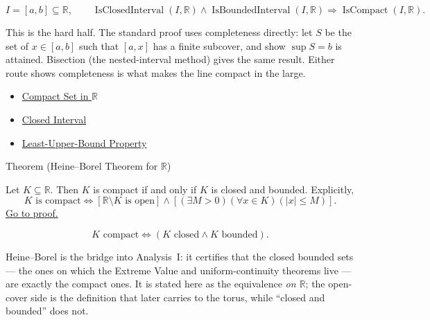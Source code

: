 \begin{remark*}
\[
I=[a,b]\subseteq\mathbb{R},\qquad
\operatorname{IsClosedInterval}(I,\mathbb{R})\land
\operatorname{IsBoundedInterval}(I,\mathbb{R})
\Longrightarrow
\operatorname{IsCompact}(I,\mathbb{R}).
\]
\end{remark*}
\begin{remark*}[Interpretation]
This is the hard half. The standard proof uses completeness directly: let $S$ be the set of $x\in[a,b]$ such that $[a,x]$ has a finite subcover, and show $\sup S=b$ is attained. Bisection (the nested-interval method) gives the same result. Either route shows completeness is what makes the line compact in the large.
\end{remark*}
\begin{dependencies}
\begin{itemize}
  \item \hyperref[def:compact-set]{Compact Set in $\mathbb{R}$}
  \item \hyperref[def:closed-interval]{Closed Interval}
  \item \hyperref[thm:lub-property-r]{Least-Upper-Bound Property}
\end{itemize}
\end{dependencies}
\begin{theorembox}{Theorem (Heine--Borel Theorem for $\mathbb{R}$)}
\begin{theorem}
\label{thm:heine-borel}
Let $K\subseteq\mathbb{R}$.  Then $K$ is compact if and only if $K$ is closed
and bounded.  Explicitly,
\[
  K\text{ is compact}
  \Longleftrightarrow
  \left[
  \mathbb{R}\setminus K\text{ is open}
  \right]
  \land
  \left[
  (\exists M>0)(\forall x\in K)(|x|\leq M)
  \right].
\]
\hyperref[prf:heine-borel]{Go to proof.}
\end{theorem}
\end{theorembox}
\begin{remark*}
\[
K \text{ compact} \Longleftrightarrow (K \text{ closed} \land K \text{ bounded}).
\]
\end{remark*}
\begin{remark*}[Interpretation]
Heine--Borel is the bridge into Analysis~I: it certifies that the closed bounded sets --- the ones on which the Extreme Value and uniform-continuity theorems live --- are exactly the compact ones. It is stated here as the equivalence \emph{on $\mathbb{R}$}; the open-cover side is the definition that later carries to the torus, while ``closed and bounded'' does not.
\end{remark*}
